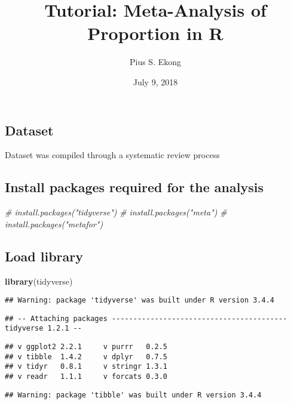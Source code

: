 \documentclass[]{article}
\title{Tutorial: Meta-Analysis of Proportion in R}
\author{Pius S. Ekong}
\date{July 9, 2018}
\newenvironment{Shaded}{\begin{snugshade}}{\end{snugshade}}
\newcommand{\KeywordTok}[1]{\textcolor[rgb]{0.13,0.29,0.53}{\textbf{#1}}}
\newcommand{\CommentTok}[1]{\textcolor[rgb]{0.56,0.35,0.01}{\textit{#1}}}
\newcommand{\NormalTok}[1]{#1}
\begin{document}
\maketitle

\subsection{Dataset}\label{dataset}

Dataset was compiled through a systematic review process

\subsection{Install packages required for the
analysis}\label{install-packages-required-for-the-analysis}

\begin{Shaded}
\begin{Highlighting}[]
\CommentTok{# install.packages("tidyverse")}
\CommentTok{# install.packages("meta")}
\CommentTok{# install.packages("metafor")}
\end{Highlighting}
\end{Shaded}

\subsection{Load library}\label{load-library}

\begin{Shaded}
\begin{Highlighting}[]
\KeywordTok{library}\NormalTok{(tidyverse)}
\end{Highlighting}
\end{Shaded}

\begin{verbatim}
## Warning: package 'tidyverse' was built under R version 3.4.4
\end{verbatim}

\begin{verbatim}
## -- Attaching packages ----------------------------------------- tidyverse 1.2.1 --
\end{verbatim}

\begin{verbatim}
## v ggplot2 2.2.1     v purrr   0.2.5
## v tibble  1.4.2     v dplyr   0.7.5
## v tidyr   0.8.1     v stringr 1.3.1
## v readr   1.1.1     v forcats 0.3.0
\end{verbatim}

\begin{verbatim}
## Warning: package 'tibble' was built under R version 3.4.4
\end{verbatim}
\end{document}
